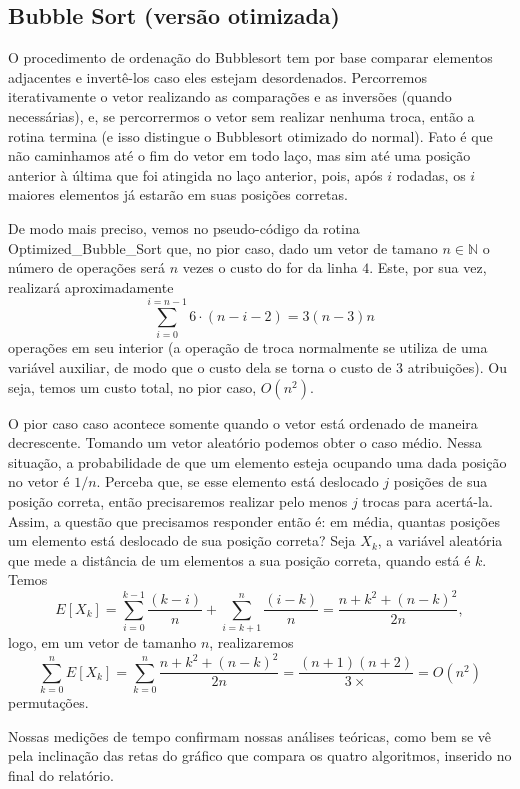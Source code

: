 \documentclass{article}
\begin{document}
\subsection{Bubble Sort (versão otimizada)}
O procedimento de ordenação do Bubblesort tem por base comparar elementos adjacentes e invertê-los caso eles estejam desordenados. Percorremos iterativamente o vetor realizando as comparações e as inversões (quando necessárias), e, se percorrermos o vetor sem realizar nenhuma troca, então a rotina termina (e isso distingue o Bubblesort otimizado do normal). Fato é que não caminhamos até o fim do vetor em todo laço, mas sim até uma posição anterior à última que foi atingida no laço anterior, pois, após $i$ rodadas, os $i$ maiores elementos já estarão em suas posições corretas.\par
%
De modo mais preciso, vemos no pseudo-código da rotina Optimized\_Bubble\_Sort que, no pior caso, dado um vetor de tamano $n \in \mathbb{N}$ o número de operações será $n$ vezes o custo do for da linha $4$. Este, por sua vez, realizará aproximadamente 
\[\sum_{i = 0}^{i = n-1}6\cdot(n-i-2) = 3(n - 3)n\] operações em seu interior (a operação de troca normalmente se utiliza de uma variável auxiliar, de modo que o custo dela se torna o custo de 3 atribuições). Ou seja, temos um custo total, no pior caso, $O(n^2)$.\par
O pior caso caso acontece somente quando o vetor está ordenado de maneira decrescente. Tomando um vetor aleatório podemos obter o caso médio. Nessa situação, a probabilidade de que um elemento esteja ocupando uma dada posição no vetor é $1/n$. Perceba que, se esse elemento está deslocado $j$ posições de sua posição correta, então precisaremos realizar pelo menos $j$ trocas para acertá-la. Assim, a questão que precisamos responder então é: em média, quantas posições um elemento está deslocado de sua posição correta? Seja $X_k$, a variável aleatória que mede a distância de um elementos a sua posição correta, quando está é $k$. Temos \[E[X_k] = \sum_{i = 0}^{k-1}\frac{(k-i)}{n}+\sum_{i = k+1}^{n}\frac{(i - k)}{n} = \frac{n+k^{2}+(n-k)^{2}}{2n},\] logo, em um vetor de tamanho $n$, realizaremos \[\sum_{k=0}^{n}E[X_k] = \sum_{k=0}^{n}\frac{n+k^{2}+(n-k)^{2}}{2n} = \frac{(n+1)(n+2)}{3×} = O(n^2)\] permutações.\par
%
Nossas medições de tempo confirmam nossas análises teóricas, como bem se vê pela inclinação das retas do gráfico que compara os quatro algoritmos, inserido no final do relatório.
%
\end{document}
